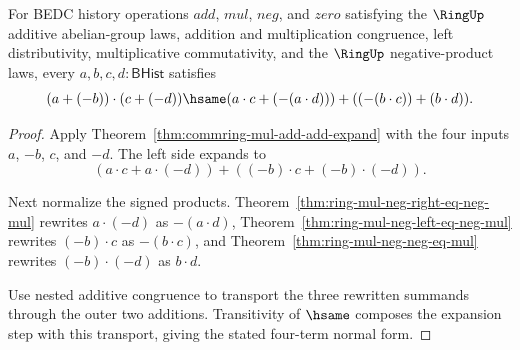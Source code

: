 \begin{theorem}
\label{thm:commring-signed-binary-product-normal-form}
For BEDC history operations $add$, $mul$, $neg$, and $zero$ satisfying the
$\RingUp$ additive abelian-group laws, addition and multiplication
congruence, left distributivity, multiplicative commutativity, and the
$\RingUp$ negative-product laws, every $a,b,c,d : \mathsf{BHist}$ satisfies
$$
(a+(-b))\cdot(c+(-d))\hsame
(a\cdot c+(-(a\cdot d)))+((-(b\cdot c))+(b\cdot d)).
$$
\end{theorem}
\begin{proof}
Apply Theorem~\ref{thm:commring-mul-add-add-expand} with the four inputs
$a$, $-b$, $c$, and $-d$. The left side expands to
$$
(a\cdot c+a\cdot(-d))+((-b)\cdot c+(-b)\cdot(-d)).
$$

Next normalize the signed products. Theorem~\ref{thm:ring-mul-neg-right-eq-neg-mul}
rewrites $a\cdot(-d)$ as $-(a\cdot d)$,
Theorem~\ref{thm:ring-mul-neg-left-eq-neg-mul} rewrites $(-b)\cdot c$ as
$-(b\cdot c)$, and Theorem~\ref{thm:ring-mul-neg-neg-eq-mul} rewrites
$(-b)\cdot(-d)$ as $b\cdot d$.

Use nested additive congruence to transport the three rewritten summands
through the outer two additions. Transitivity of $\hsame$ composes the
expansion step with this transport, giving the stated four-term normal form.
\end{proof}

